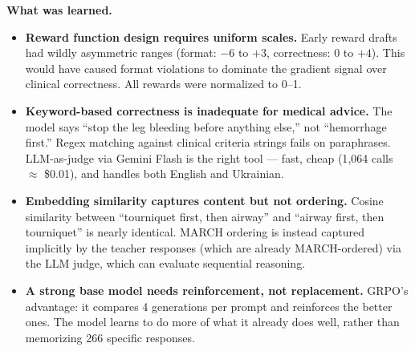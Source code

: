 \documentclass{article}
\theoremstyle{plain}
\theoremstyle{definition}
\theoremstyle{remark}
\begin{document}
\textbf{What was learned.}
\begin{itemize}
\item \textbf{Reward function design requires uniform scales.} Early reward drafts had wildly asymmetric ranges (format: $-6$ to $+3$, correctness: $0$ to $+4$). This would have caused format violations to dominate the gradient signal over clinical correctness. All rewards were normalized to 0--1.
\item \textbf{Keyword-based correctness is inadequate for medical advice.} The model says ``stop the leg bleeding before anything else,'' not ``hemorrhage first.'' Regex matching against clinical criteria strings fails on paraphrases. LLM-as-judge via Gemini Flash is the right tool --- fast, cheap (1{,}064 calls $\approx$ \$0.01), and handles both English and Ukrainian.
\item \textbf{Embedding similarity captures content but not ordering.} Cosine similarity between ``tourniquet first, then airway'' and ``airway first, then tourniquet'' is nearly identical. MARCH ordering is instead captured implicitly by the teacher responses (which are already MARCH-ordered) via the LLM judge, which can evaluate sequential reasoning.
\item \textbf{A strong base model needs reinforcement, not replacement.} GRPO's advantage: it compares 4 generations per prompt and reinforces the better ones. The model learns to do more of what it already does well, rather than memorizing 266 specific responses.
\end{itemize}
\end{document}
